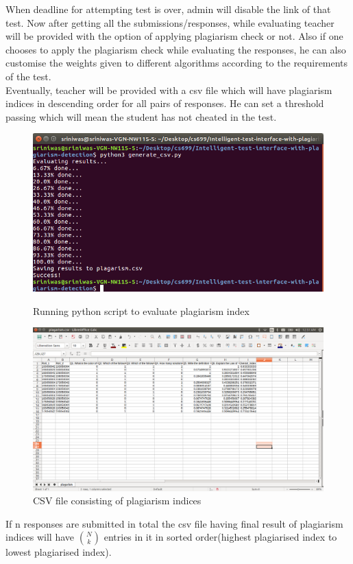 When deadline for attempting test is over, admin will disable the link of that test. Now after getting all the submissions/responses, while evaluating teacher will be provided with the option of applying plagiarism check or not. Also if one chooses to apply the plagiarism check while evaluating the responses, he can also customise the weights given to different algorithms according to the requirements of the test. \\
Eventually, teacher will be provided with a csv file which will have plagiarism indices in descending order for all pairs of responses. He can set a threshold passing which will mean the student has not cheated in the test.
\begin{figure}[H]
\label{fig1}
      \centering
  \begin{minipage}[b]{0.45\textwidth}
    \includegraphics[width=\textwidth]{images/python_script.png}
    \caption{Running python script to evaluate plagiarism index}
  \end{minipage}
  \hfill
  \begin{minipage}[b]{0.45\textwidth}
    \includegraphics[width=\textwidth]{images/results_csv.png}
    \caption{CSV file consisting of plagiarism indices}
  \end{minipage}
  \hfill
\end{figure} 
If n responses are submitted in total the csv file having final result of plagiarism indices will have $\binom{N}{k}$ entries in it in sorted order(highest plagiarised index to lowest plagiarised index).

